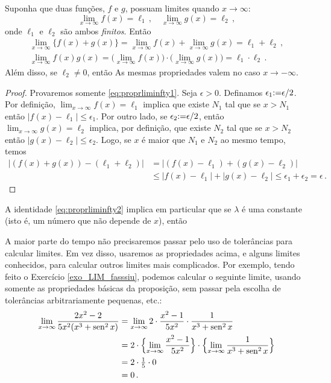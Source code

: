 \begin{pro}\label{Prop:SomasProdLimInfinito}
Suponha que duas funções, $f$ e $g$,
possuam limites quando $x\to\infty$: 
$$\lim_{x\to\infty}f(x)=\ell_1\,,\quad
\lim_{x\to\infty}g(x)=\ell_2\,,$$
onde $\ell_1$ e $\ell_2$ são ambos \emph{finitos}. Então 
\begin{gather}
\lim_{x\to\infty}\{f(x)+g(x)\}=
\lim_{x\to\infty}f(x)+\lim_{x\to\infty}g(x)=\ell_1+\ell_2\,,
\label{eq:proprliminfty1} \\
\lim_{x\to\infty}f(x)g(x)=
\bigl(\lim_{x\to\infty}f(x)\bigr)\cdot
\bigl(\lim_{x\to\infty}g(x)\bigr)=\ell_1\cdot
\ell_2\,.\label{eq:proprliminfty2}
\end{gather}
Além disso, se $\ell_2\neq 0$, então
As mesmas propriedades valem no caso $x\to-\infty$.
\end{pro}

\begin{proof} Provaremos somente \eqref{eq:proprliminfty1}. 
Seja $\epsilon>0$. Definamos $\epsilon_1{:=} \epsilon/2$.
Por definição, $\lim_{x\to\infty}f(x)=\ell_1$ implica 
que existe $N_1$ tal que se $x>N_1$ então 
$|f(x)-\ell_1|\leq \epsilon_1$.
Por outro lado, se $\epsilon_2{:=} \epsilon/2$, então 
$\lim_{x\to\infty}g(x)=\ell_2$ implica,
por definição, que existe $N_2$ tal que se $x>N_2$ então 
$|g(x)-\ell_2|\leq \epsilon_2$.
Logo, se $x$ é maior que $N_1$ e $N_2$ ao mesmo tempo, temos
\begin{align*}
\bigl|(f(x)+g(x))-(\ell_1+\ell_2)\bigr|&=
\bigl|(f(x)-\ell_1)+(g(x)-\ell_2)\bigr|\\
&\leq |f(x)-\ell_1|+|g(x)-\ell_2|\leq
\epsilon_1+\epsilon_2=\epsilon\,.
\end{align*}
\end{proof}


A identidade \eqref{eq:proprliminfty2} implica em particular que se 
$\lambda$ é uma constante (isto é, um número que não depende de $x$), 
então 

A maior parte do tempo não precisaremos passar pelo uso de
tolerâncias para calcular limites. Em vez disso, 
usaremos as propriedades acima, e alguns
limites conhecidos, para calcular outros limites mais complicados.
Por exemplo, tendo feito o Exercício \ref{exo_LIM_fasssiu}, podemos
calcular o
seguinte limite, usando somente as propriedades básicas da proposição, sem
passar pela escolha de tolerâncias arbitrariamente pequenas, etc.:
\begin{align*}
 \lim_{x\to\infty}\frac{2x^2-2}{5x^2(x^3+\operatorname{sen}^2x)}
 &=
 \lim_{x\to\infty}2\cdot\frac{x^2-1}{5x^2}\cdot\frac{1}{x^3+\operatorname{sen}^2x}\\
 &=
2\cdot\Bigl\{\lim_{x\to\infty}\frac{x^2-1}{5x^2}\Bigr\}
\cdot\Bigl\{\lim_{x\to\infty}
\frac{1}{x^3+\operatorname{sen}^2x}\Bigr\}\\
&=2\cdot \tfrac15\cdot 0\\
&=0\,.
\end{align*}

